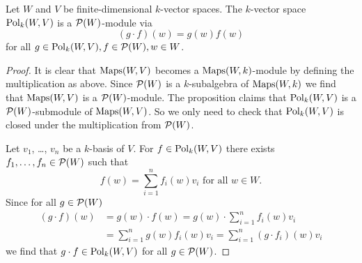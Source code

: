 \begin{prop}
 Let $W$ and $V$ be finite-dimensional $k$-vector spaces. The $k$-vector space $\operatorname{Pol}_k(W,V)$ is a $\mathcal{P}(W)$-module via
 \[
  (g \cdot f)(w) = g(w) f(w)
 \]
 for all $g \in \operatorname{Pol}_k(W,V), f \in \mathcal{P}(W), w \in W$.
\end{prop}
\begin{proof}
 It is clear that $\operatorname{Maps}(W,V)$ becomes a $\operatorname{Maps}(W,k)$-module by defining the multiplication as above. Since $\mathcal{P}(W)$ is a $k$-subalgebra of $\operatorname{Maps}(W,k)$ we find that $\operatorname{Maps}(W,V)$ is a $\mathcal{P}(W)$-module. The proposition claims that $\operatorname{Pol}_k(W,V)$ is a $\mathcal{P}(W)$-submodule of $\operatorname{Maps}(W,V)$. So we only need to check that $\operatorname{Pol}_k(W,V)$ is closed under the multiplication from $\mathcal{P}(W)$.
 
 Let $v_1$, \dots, $v_n$ be a $k$-basis of $V$. For $f \in \operatorname{Pol}_k(W,V)$ there exists $f_1, \dotsc, f_n \in \mathcal{P}(W)$ such that
 \[
  f(w) = \sum_{i=1}^n f_i(w) v_i \text{ for all } w \in W.
 \]
 Since for all $g \in \mathcal{P}(W)$
 \begin{align*}
  (g \cdot f)(w)
  &= g(w) \cdot f(w)
  = g(w) \cdot \sum_{i=1}^n f_i(w) v_i \\
  &= \sum_{i=1}^n g(w) f_i(w) v_i
  = \sum_{i=1}^n (g \cdot f_i)(w) v_i
 \end{align*}
 we find that $g \cdot f \in \operatorname{Pol}_k(W,V)$ for all $g \in \mathcal{P}(W)$.
\end{proof}



